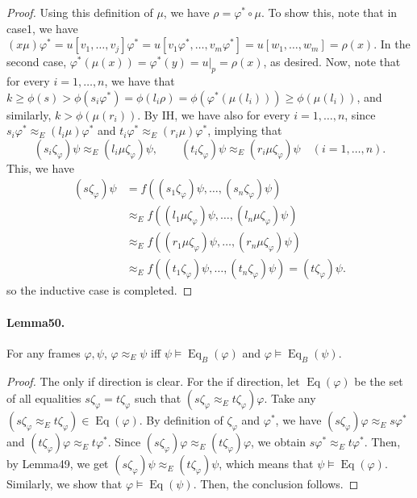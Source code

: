 \documentclass[10pt,a4paper]{amsart}
\begin{document}
\begin{proof}
Using this definition of $\mu$, we have $\rho=\varphi^*\circ\mu$.
To show this, note that in case1, we have $(x\mu)\varphi^*=u[v_1,\ldots,v_j]\varphi^*=u[v_1\varphi^*,\ldots,v_m\varphi^*]=u[w_1,\ldots,w_m]=\rho(x)$.
In the second case, $\varphi^*(\mu(x))=\varphi^*(y)=u|_p=\rho(x)$, as desired.
Now, note that for every $i=1,\ldots,n$, we have that $k\ge\phi(s)>\phi(s_i\varphi^*)=\phi(l_i\rho)=\phi(\varphi^*(\mu(l_i)))\ge\phi(\mu(l_i))$, and similarly, $k>\phi(\mu(r_i))$.
By IH, we have also for every $i=1,\ldots,n$, since $s_i\varphi^*\approx_E(l_i\mu)\varphi^*$ and $t_i\varphi^*\approx_E(r_i\mu)\varphi^*$, implying that
\[
(s_i\zeta_\varphi)\psi\approx_E(l_i\mu\zeta_\varphi)\psi,\qquad (t_i\zeta_\varphi)\psi\approx_E(r_i\mu\zeta_\varphi)\psi\quad(i=1,\ldots,n).
\]
This, we have
\begin{align*}
(s\zeta_\varphi)\psi&=f((s_1\zeta_\varphi)\psi,\ldots,(s_n\zeta_\varphi)\psi)\\
&\approx_Ef((l_1\mu\zeta_\varphi)\psi,\ldots,(l_n\mu\zeta_\varphi)\psi)\\
&\approx_Ef((r_1\mu\zeta_\varphi)\psi,\ldots,(r_n\mu\zeta_\varphi)\psi)\\
&\approx_Ef((t_1\zeta_\varphi)\psi,\ldots,(t_n\zeta_\varphi)\psi)=(t\zeta_\varphi)\psi.
\end{align*}
so the inductive case is completed.
\end{proof}
\paragraph{Lemma50.} For any frames $\varphi,\psi$, $\varphi\approx_E\psi$ iff $\psi\models\operatorname{Eq}_B(\varphi)$ and $\varphi\models\operatorname{Eq}_B(\psi)$.
\begin{proof}
The only if direction is clear. For the if direction, let $\operatorname{Eq}(\varphi)$ be the set of all equalities $s\zeta_\varphi=t\zeta_\varphi$ such that $(s\zeta_\varphi\approx_Et\zeta_\varphi)\varphi$.
Take any $(s\zeta_\varphi\approx_Et\zeta_\varphi)\in\operatorname{Eq}(\varphi)$.
By definition of $\zeta_\varphi$ and $\varphi^*$, we have $(s\zeta_\varphi)\varphi\approx_Es\varphi^*$ and $(t\zeta_\varphi)\varphi\approx_Et\varphi^*$.
Since $(s\zeta_\varphi)\varphi\approx_E(t\zeta_\varphi)\varphi$, we obtain $s\varphi^*\approx_Et\varphi^*$.
Then, by Lemma49, we get $(s\zeta_\varphi)\psi\approx_E(t\zeta_\varphi)\psi$, which means that $\psi\models\operatorname{Eq}(\varphi)$.
Similarly, we show that $\varphi\models\operatorname{Eq}(\psi)$. Then, the conclusion follows.
\end{proof}
\end{document}
